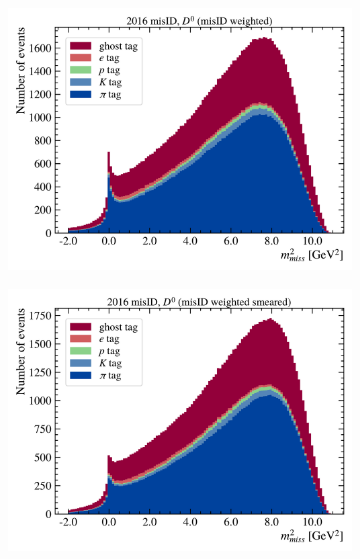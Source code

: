 \begin{figure}[htb]
    \centering
    \begin{subfigure}[b]{0.32\textwidth}
        \centering
        \includegraphics[width=\textwidth]{figs-fit-fit-templates/data-driven-plots/misid/D0_mm2.pdf}
    \end{subfigure}
    \hfill
    \begin{subfigure}[b]{0.32\textwidth}
        \centering
        \includegraphics[width=\textwidth]{figs-fit-fit-templates/data-driven-plots/misid/D0_mm2_smr.pdf}
    \end{subfigure}

\end{figure}
